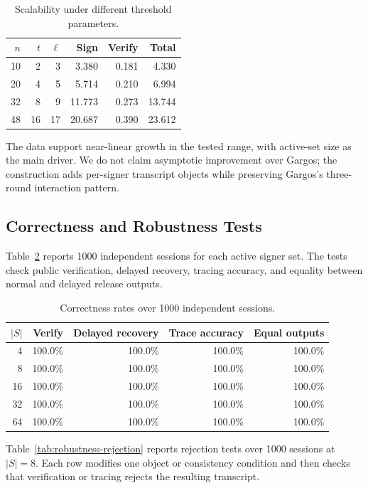 \begin{table}[t]
\centering
\caption{Scalability under different threshold parameters.}
\label{tab:scalability-nt}
\small
\begin{tabular}{rrrrrr}
\toprule
$n$ & $t$ & $\ell$ & Sign & Verify & Total \\
\midrule
10 & 2 & 3 & 3.380 & 0.181 & 4.330 \\
20 & 4 & 5 & 5.714 & 0.210 & 6.994 \\
32 & 8 & 9 & 11.773 & 0.273 & 13.744 \\
48 & 16 & 17 & 20.687 & 0.390 & 23.612 \\
\bottomrule
\end{tabular}
\end{table}

The data support near-linear growth in the tested range, with active-set size as
the main driver.  We do not claim asymptotic improvement over Gargos; the
construction adds per-signer transcript objects while preserving Gargos's
three-round interaction pattern.

\subsection{Correctness and Robustness Tests}

Table~\ref{tab:correctness-rates} reports 1000 independent sessions for each
active signer set.  The tests check public verification, delayed recovery,
tracing accuracy, and equality between normal and delayed release outputs.

\begin{table}[t]
\centering
\caption{Correctness rates over 1000 independent sessions.}
\label{tab:correctness-rates}
\small
\begin{tabular}{rrrrr}
\toprule
$|S|$ & Verify & Delayed recovery & Trace accuracy & Equal outputs \\
\midrule
4 & 100.0\% & 100.0\% & 100.0\% & 100.0\% \\
8 & 100.0\% & 100.0\% & 100.0\% & 100.0\% \\
16 & 100.0\% & 100.0\% & 100.0\% & 100.0\% \\
32 & 100.0\% & 100.0\% & 100.0\% & 100.0\% \\
64 & 100.0\% & 100.0\% & 100.0\% & 100.0\% \\
\bottomrule
\end{tabular}
\end{table}

Table~\ref{tab:robustness-rejection} reports rejection tests over 1000 sessions
at $|S|=8$.  Each row modifies one object or consistency condition and then
checks that verification or tracing rejects the resulting transcript.

